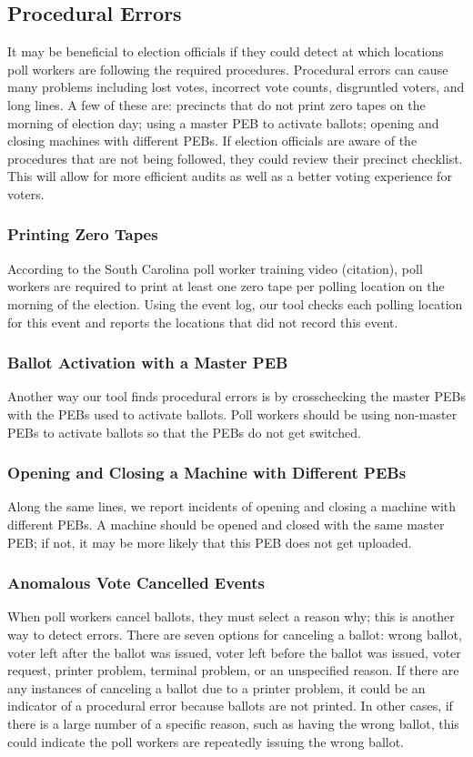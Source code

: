 \subsection{Procedural Errors}
It may be beneficial to election officials if they could detect at which locations poll workers are following the required procedures.  Procedural errors can cause many problems including lost votes, incorrect vote counts, disgruntled voters, and long lines.  A few of these are: precincts that do not print zero tapes on the morning of election day; using a master PEB to activate ballots; opening and closing machines with different PEBs.  
If election officials are aware of the procedures that are not being followed, they could review their precinct checklist.  This will allow for more efficient audits as well as a better voting experience for voters.  

\subsubsection{Printing Zero Tapes}
According to the South Carolina poll worker training video (citation), poll workers are required to print at least one zero tape per polling location on the morning of the election.  Using the event log, our tool checks each polling location for this event and reports the locations that did not record this event.  

\subsubsection{Ballot Activation with a Master PEB}
Another way our tool finds procedural errors is by crosschecking the master PEBs with the PEBs used to activate ballots.  Poll workers should be using non-master PEBs to activate ballots so that the PEBs do not get switched.  

\subsubsection{Opening and Closing a Machine with Different PEBs}
Along the same lines, we report incidents of opening and closing a machine with different PEBs.  A machine should be opened and closed with the same master PEB; if not, it may be more likely that this PEB does not get uploaded.   

\subsubsection{Anomalous Vote Cancelled Events}
When poll workers cancel ballots, they must select a reason why; this is another way to detect errors.  There are seven options for canceling a ballot: wrong ballot, voter left after the ballot was issued, voter left before the ballot was issued, voter request, printer problem, terminal problem, or an unspecified reason.  If there are any instances of canceling a ballot due to a printer problem, it could be an indicator of a procedural error because ballots are not printed.  In other cases, if there is a large number of a specific reason, such as having the wrong ballot, this could indicate the poll workers are repeatedly issuing the wrong ballot.  



